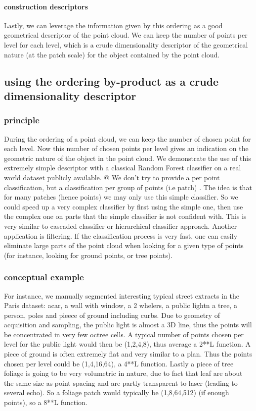 			\paragraph{construction descriptors}
				Lastly, we can leverage the information given by this ordering as a good geometrical descriptor of the point cloud.
				We can keep the number of points per level for each level, which is a crude dimensionality descriptor of the geometrical nature (at the patch scale) for the object contained by the point cloud.
				
	\subsection{using the ordering by-product as a crude dimensionality descriptor}
		\subsubsection{principle}
			During the ordering of a point cloud, we can keep the number of chosen point for each level.
			Now this number of chosen points per level gives an indication on the geometric nature of the object in the point cloud. 
			We demonstrate the use of this extremely simple descriptor with a classical Random Forest classifier on a real world dataset publicly available.
			@
			We don't try to provide a per point classification, but a classification per group of points (i.e patch) . 
			The idea is that for many patches (hence points) we may only use this simple classifier. So we could speed up a very complex classifier by first using the simple one, then use the complex one on parts that the simple classifier is not confident with.
			This is very similar to cascaded classifier or hierarchical classifier approach.
			Another application is filtering. If the classification process is very fast, one can easily eliminate large parts of the point cloud when looking for a given type of points (for instance, looking for ground points, or tree points).
		\subsubsection{conceptual example}
			 
			For instance, we manually segmented interesting typical street extracts in the Paris dataset: acar, a wall with window, a 2 whelers, a public lightn a tree, a person, poles and pieece of ground including curbs.
			Due to geometry of acquisition and sampling, the public light is almost a 3D line, thus the points will be concentrated in very few octree cells.
			A typical number of points chosen per level  for the public light would then be (1,2,4,8), thus average a 2**L function.
			A piece of ground is often extremely flat and very similar to a plan.
			Thus the points chosen per level could be (1,4,16,64), a 4**L function.
			Lastly a piece of tree foliage is going to be very volumetric in nature, due to fact that leaf are about the same size as point spacing and are partly transparent to laser (leading to several echo).
			So a foliage patch would typically be (1,8,64,512) (if enough points), so a 8**L function.
			

